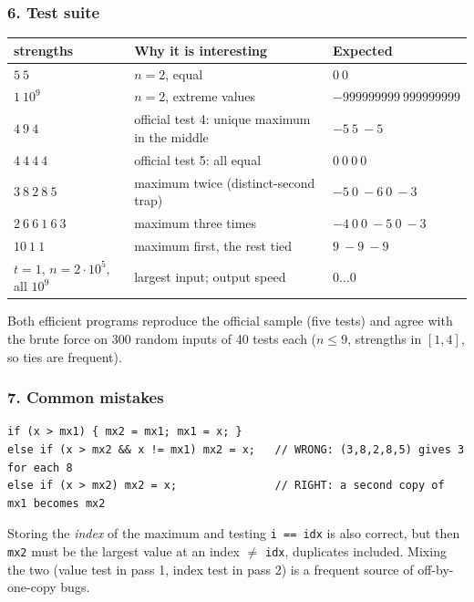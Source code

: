 \subsubsection*{6. Test suite}

\begin{testbox}
\centering\small
\begin{tabular}{@{}lll@{}}
\toprule
\textbf{strengths} & \textbf{Why it is interesting} & \textbf{Expected} \\
\midrule
$5\ 5$ & $n = 2$, equal & $0\ 0$ \\
$1\ 10^9$ & $n = 2$, extreme values & $-999999999\ 999999999$ \\
$4\ 9\ 4$ & official test 4: unique maximum in the middle & $-5\ 5\ -5$ \\
$4\ 4\ 4\ 4$ & official test 5: all equal & $0\ 0\ 0\ 0$ \\
$3\ 8\ 2\ 8\ 5$ & maximum twice (distinct-second trap) & $-5\ 0\ -6\ 0\ -3$ \\
$2\ 6\ 6\ 1\ 6\ 3$ & maximum three times & $-4\ 0\ 0\ -5\ 0\ -3$ \\
$10\ 1\ 1$ & maximum first, the rest tied & $9\ -9\ -9$ \\
$t = 1$, $n = 2\cdot10^5$, all $10^9$ & largest input; output speed & $0 \dots 0$ \\
\bottomrule
\end{tabular}
\end{testbox}
Both efficient programs reproduce the official sample (five tests) and agree with the brute force on 300 random inputs of 40 tests each ($n \le 9$, strengths in $[1, 4]$, so ties are frequent).

\subsubsection*{7. Common mistakes}

\begin{warningbox}
\begin{lstlisting}[style=snippet]
if (x > mx1) { mx2 = mx1; mx1 = x; }
else if (x > mx2 && x != mx1) mx2 = x;   // WRONG: (3,8,2,8,5) gives 3 for each 8
else if (x > mx2) mx2 = x;               // RIGHT: a second copy of mx1 becomes mx2
\end{lstlisting}
\end{warningbox}

\begin{warningbox}
Storing the \emph{index} of the maximum and testing \texttt{i == idx} is also correct, but then \texttt{mx2} must be the largest value at an index $\ne$ \texttt{idx}, duplicates included. Mixing the two (value test in pass 1, index test in pass 2) is a frequent source of off-by-one-copy bugs.
\end{warningbox}

